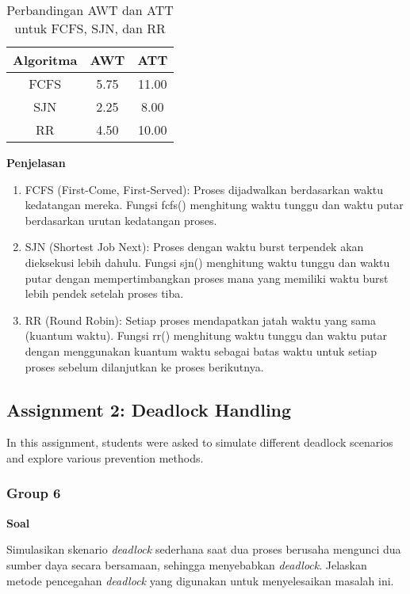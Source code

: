 \documentclass[12pt]{article}
\begin{document}
\begin{table}
\centering
\begin{tabular}{|c|c|c|}
\hline
\textbf{Algoritma} & \textbf{AWT} & \textbf{ATT} \\ \hline
FCFS               & 5.75                                & 11.00                                  \\ \hline
SJN                & 2.25                                & 8.00                                  \\ \hline
RR                 & 4.50                                & 10.00                                 \\ \hline
\end{tabular}
\caption{Perbandingan AWT dan ATT untuk FCFS, SJN, dan RR}
\label{tab:comparison}
\end{table}
\textbf{Penjelasan}
\begin{enumerate}
    \item{FCFS (First-Come, First-Served)}: Proses dijadwalkan berdasarkan waktu kedatangan mereka. Fungsi fcfs() menghitung waktu tunggu dan waktu putar berdasarkan urutan kedatangan proses.
    \item{SJN (Shortest Job Next)}: Proses dengan waktu burst terpendek akan dieksekusi lebih dahulu. Fungsi sjn() menghitung waktu tunggu dan waktu putar dengan mempertimbangkan proses mana yang memiliki waktu burst lebih pendek setelah proses tiba.
    \item{RR (Round Robin)}: Setiap proses mendapatkan jatah waktu yang sama (kuantum waktu). Fungsi rr() menghitung waktu tunggu dan waktu putar dengan menggunakan kuantum waktu sebagai batas waktu untuk setiap proses sebelum dilanjutkan ke proses berikutnya.
\end{enumerate}

\subsection{Assignment 2: Deadlock Handling}
In this assignment, students were asked to simulate different deadlock scenarios and explore various prevention methods.

\subsubsection{Group 6}
\vspace{0.5cm}
\textbf{Soal}
\vspace{0.5cm}

Simulasikan skenario \textit{deadlock} sederhana saat dua proses berusaha mengunci dua sumber daya secara bersamaan, sehingga menyebabkan \textit{deadlock}. Jelaskan metode pencegahan \textit{deadlock} yang digunakan untuk menyelesaikan masalah ini.
\end{document}
